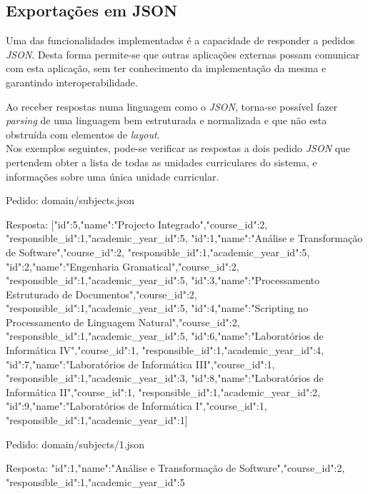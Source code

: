 \subsection{Exportações em JSON}

Uma das funcionalidades implementadas é a capacidade de responder a pedidos \textit{JSON}. Desta forma permite-se que outras aplicações externas possam comunicar com esta aplicação, sem ter conhecimento da implementação da mesma e garantindo interoperabilidade.

Ao receber respostas numa linguagem como o \textit{JSON}, torna-se possível fazer \textit{parsing} de uma linguagem bem estruturada e normalizada e que não esta obstruída com elementos de \textit{layout}.\\

Nos exemplos seguintes, pode-se verificar as respostas a dois pedido \textit{JSON} que pertendem obter a lista de todas as unidades curriculares do sistema, e informações sobre uma única unidade curricular.

\begin{spverbatim}
	Pedido:
	domain/subjects.json

	Resposta:
	[{"id":5,"name":"Projecto Integrado","course_id":2,
	"responsible_id":1,"academic_year_id":5},
	{"id":1,"name":"Análise e Transformação de Software","course_id":2,
	"responsible_id":1,"academic_year_id":5},
	{"id":2,"name":"Engenharia Gramatical","course_id":2,
	"responsible_id":1,"academic_year_id":5},
	{"id":3,"name":"Processamento Estruturado de Documentos","course_id":2,
	"responsible_id":1,"academic_year_id":5},
	{"id":4,"name":"Scripting no Processamento de Linguagem Natural","course_id":2,
	"responsible_id":1,"academic_year_id":5},
	{"id":6,"name":"Laboratórios de Informática IV","course_id":1,
	"responsible_id":1,"academic_year_id":4},
	{"id":7,"name":"Laboratórios de Informática III","course_id":1,
	"responsible_id":1,"academic_year_id":3},
	{"id":8,"name":"Laboratórios de Informática II","course_id":1,
	"responsible_id":1,"academic_year_id":2},
	{"id":9,"name":"Laboratórios de Informática I","course_id":1,
	"responsible_id":1,"academic_year_id":1}]
\end{spverbatim}

\begin{spverbatim}
	Pedido:
	domain/subjects/1.json

	Resposta:
	{"id":1,"name":"Análise e Transformação de Software","course_id":2,
	"responsible_id":1,"academic_year_id":5}
\end{spverbatim}
